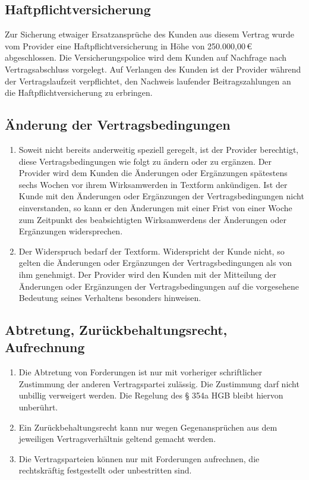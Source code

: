 \documentclass{terms}
\begin{document}
\subsection{Haftpflichtversicherung}
Zur Sicherung etwaiger Ersatzansprüche des Kunden aus diesem Vertrag wurde vom Provider eine Haftpflichtversicherung in Höhe von 250.000,00\,€ abgeschlossen. Die Versicherungspolice wird dem Kunden auf Nachfrage nach Vertragsabschluss vorgelegt. Auf Verlangen des Kunden ist der Provider während der Vertragslaufzeit verpflichtet, den Nachweis laufender Beitragszahlungen an die Haftpflichtversicherung zu erbringen.

\subsection{Änderung der Vertragsbedingungen}
\begin{enumerate}
\item Soweit nicht bereits anderweitig speziell geregelt, ist der Provider berechtigt, diese Vertragsbedingungen wie folgt zu ändern oder zu ergänzen. Der Provider wird dem Kunden die Änderungen oder Ergänzungen spätestens sechs Wochen vor ihrem Wirksamwerden in Textform ankündigen. Ist der Kunde mit den Änderungen oder Ergänzungen der Vertragsbedingungen nicht einverstanden, so kann er den Änderungen mit einer Frist von einer Woche zum Zeitpunkt des beabsichtigten Wirksamwerdens der Änderungen oder Ergänzungen widersprechen. 
\item Der Widerspruch bedarf der Textform. Widerspricht der Kunde nicht, so gelten die Änderungen oder Ergänzungen der Vertragsbedingungen als von ihm genehmigt. Der Provider wird den Kunden mit der Mitteilung der Änderungen oder Ergänzungen der Vertragsbedingungen auf die vorgesehene Bedeutung seines Verhaltens besonders hinweisen.
\end{enumerate}

\subsection{Abtretung, Zurückbehaltungsrecht, Aufrechnung}
\begin{enumerate}
\item Die Abtretung von Forderungen ist nur mit vorheriger schriftlicher Zustimmung der anderen Vertragspartei zulässig. Die Zustimmung darf nicht unbillig verweigert werden. Die Regelung des § 354a HGB bleibt hiervon unberührt.
\item Ein Zurückbehaltungsrecht kann nur wegen Gegenansprüchen aus dem jeweiligen Vertragsverhältnis geltend gemacht werden.
\item Die Vertragsparteien können nur mit Forderungen aufrechnen, die rechtskräftig festgestellt oder unbestritten sind.
\end{enumerate}
\end{document}
